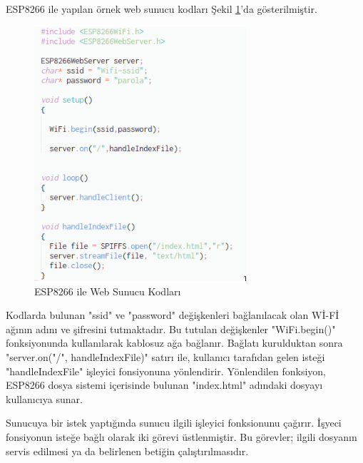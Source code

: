 ESP8266 ile yapılan örnek web sunucu kodları Şekil \ref{fig:webServer}'da gösterilmiştir.
\clearpage
\begin{figure}[h]
\centering
\includegraphics[width=0.7\textwidth]{gorseller/webServer}
\caption{ESP8266 ile Web Sunucu Kodları}\label{fig:webServer}
\end{figure}

Kodlarda bulunan "ssid" ve "password" değişkenleri bağlanılacak olan Wİ-Fİ ağının adını ve şifresini tutmaktadır. Bu tutulan değişkenler "WiFi.begin()" fonksiyonunda kullanılarak kablosuz ağa bağlanır. Bağlatı kurulduktan sonra "server.on("/", handleIndexFile)" satırı ile, kullanıcı tarafıdan gelen isteği "handleIndexFile" işleyici fonsiyonuna yönlendirir. Yönlendilen fonksiyon, ESP8266 dosya sistemi içerisinde bulunan "index.html" adındaki dosyayı kullanıcıya sunar.

Sunucuya bir istek yaptığında sunucu ilgili işleyici fonksionunu çağırır. İşyeci fonsiyonun isteğe bağlı olarak iki görevi üstlenmiştir. Bu görevler; ilgili dosyanın servis edilmesi ya da belirlenen betiğin çalıştırılmasıdır.

